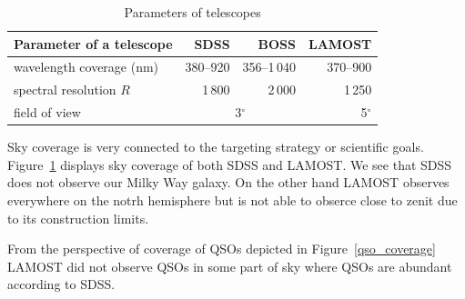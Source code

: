 \begin{table}
\begin{center}
\begin{tabular}{|l|r|r|r|}
	\hline
	Parameter of a telescope & SDSS & BOSS & LAMOST \\
	\hline \hline
	wavelength coverage (nm) & 380--920 & 356--1\,040 & 370--900 \\ \hline
	spectral resolution \(R\) & 1\,800 & 2\,000 & 1\,250 \\ \hline
	field of view & \multicolumn{2}{|c|}{3\(^{\circ}\)} & 5\(^{\circ}\) \\ \hline
\end{tabular}
\end{center}
\caption{Parameters of telescopes}
\label{telescopes_parameters}
\end{table}

Sky coverage is very connected to the targeting strategy or scientific goals.
Figure~\ref{sky_coverage} displays sky coverage of both SDSS and LAMOST.
We see that SDSS does not observe our Milky Way galaxy.
On the other hand LAMOST observes everywhere on the notrh hemisphere
but is not able to obserce close to zenit due to its construction limits.

From the perspective of coverage of QSOs depicted in Figure~\ref{qso_coverage}
LAMOST did not observe QSOs in some part of sky
where QSOs are abundant according to SDSS.

\begin{figure}
\begin{center}
\\
\end{center}
\caption[Sky coverage of SDSS and LAMOST]{}
\label{sky_coverage}
\end{figure}

